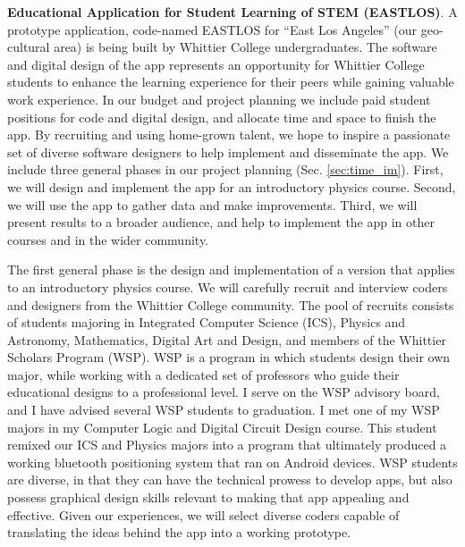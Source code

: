 \documentclass[../../main.tex]{subfiles}
\begin{document}
\textbf{Educational Application for Student Learning of STEM (EASTLOS)}.  A prototype application, code-named EASTLOS for ``East Los Angeles'' (our geo-cultural area) is being built by Whittier College undergraduates.  The software and digital design of the app represents an opportunity for Whittier College students to enhance the learning experience for their peers while gaining valuable work experience.  In our budget and project planning we include paid student positions for code and digital design, and allocate time and space to finish the app.  By recruiting and using home-grown talent, we hope to inspire a passionate set of diverse software designers to help implement and disseminate the app.  We include three general phases in our project planning (Sec. \ref{sec:time_im}).  First, we will design and implement the app for an introductory physics course.  Second, we will use the app to gather data and make improvements.  Third, we will present results to a broader audience, and help to implement the app in other courses and in the wider community. \\ \vspace{2.5mm}

The first general phase is the design and implementation of a version that applies to an introductory physics course.  We will carefully recruit and interview coders and designers from the Whittier College community.  The pool of recruits consists of students majoring in Integrated Computer Science (ICS), Physics and Astronomy, Mathematics, Digital Art and Design, and members of the Whittier Scholars Program (WSP).  WSP is a program in which students design their own major, while working with a dedicated set of professors who guide their educational designs to a professional level.  I serve on the WSP advisory board, and I have advised several WSP students to graduation.  I met one of my WSP majors in my Computer Logic and Digital Circuit Design course.  This student remixed our ICS and Physics majors into a program that ultimately produced a working bluetooth positioning system that ran on Android devices.  WSP students are diverse, in that they can have the technical prowess to develop apps, but also possess graphical design skills relevant to making that app appealing and effective.  Given our experiences, we will select diverse coders capable of translating the ideas behind the app into a working prototype. \\ \vspace{2.5mm}
\end{document}
